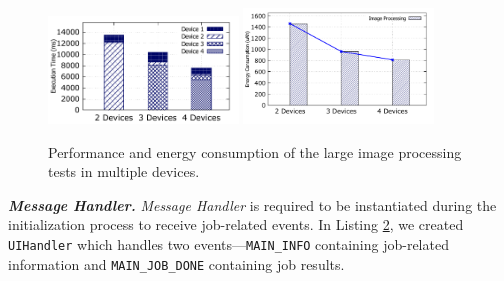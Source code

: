 \documentclass{sig-alternate}
\begin{document}
\begin{figure} 
	\centering
		\includegraphics[width=0.45\textwidth]{data/img_perf.pdf}		
		\includegraphics[width=0.45\textwidth]{data/img_energy.pdf}
	\caption{Performance and energy consumption of the large image processing tests in multiple devices.}
	\label{fig:cluster_performance}
\end{figure}

\textbf{\emph{Message Handler.}} \emph{Message Handler} is required to be instantiated during the initialization process to receive job-related events. In Listing \ref{ui_handler}, we created \texttt{UIHandler} which handles two events---\texttt{MAIN\_INFO} containing job-related information and \texttt{MAIN\_JOB\_DONE} containing job results. 

\begin{figure} [!tbh]
\noindent {}
\label{ui_handler}
\end{figure}

\end{document}
